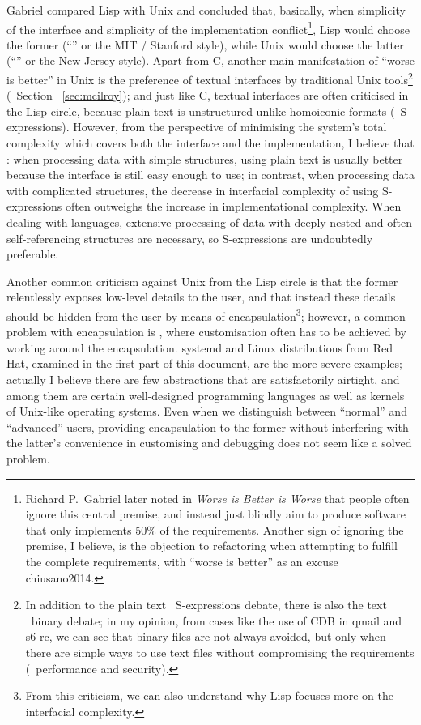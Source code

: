 Gabriel compared Lisp with Unix and concluded that, basically, when simplicity
of the interface and simplicity of the implementation conflict\footnote{Richard
P.\ Gabriel later noted in \emph{Worse is Better is Worse} that people often
ignore this central premise, and instead just blindly aim to produce software
that only implements 50\% of the requirements.  Another sign of ignoring the
premise, I believe, is the objection to refactoring when attempting to fulfill
the complete requirements, with ``worse is better'' as an excuse\cupercite%
{chiusano2014}.}, Lisp would choose the former (``'' or
the MIT / Stanford style), while Unix would choose the latter (``'' or the New Jersey style).  Apart from C, another main manifestation
of ``worse is better'' in Unix is the preference of textual interfaces by
traditional Unix tools\footnote{In addition to the plain text \vs~S-expressions
debate, there is also the text \vs~binary debate; in my opinion, from cases
like the use of CDB in qmail and s6-rc, we can see that binary files are not
always avoided, but only when there are simple ways to use text files without
compromising the requirements (\eg~performance and security).} (\cf~Section~%
\ref{sec:mcilroy}); and just like C, textual interfaces are often criticised in
the Lisp circle, because plain text is unstructured unlike homoiconic formats
(\eg~S-expressions).  However, from the perspective of minimising the system's
total complexity which covers both the interface and the implementation, I
believe that : when processing data with simple structures, using
plain text is usually better because the interface is still easy enough to use;
in contrast, when processing data with complicated structures, the decrease in
interfacial complexity of using S-expressions often outweighs the increase
in implementational complexity.  When dealing with languages, extensive
processing of data with deeply nested and often self-referencing
structures are necessary, so S-expressions are undoubtedly preferable.

Another common criticism against Unix from the Lisp circle is that the former
relentlessly exposes low-level details to the user, and that instead these
details should be hidden from the user by means of encapsulation\footnote{From
this criticism, we can also understand why Lisp focuses more on the interfacial
complexity.}; however, a common problem with encapsulation is , where customisation often has to be achieved by working around
the encapsulation.  systemd and Linux distributions from Red Hat, examined
in the first part of this document, are the more severe examples; actually
I believe there are few abstractions that are satisfactorily airtight,
and among them are certain well-designed programming languages as well
as kernels of Unix-like operating systems.  Even when we distinguish
between ``normal'' and ``advanced'' users, providing encapsulation
to the former without interfering with the latter's convenience
in customising and debugging does not seem like a solved problem.

